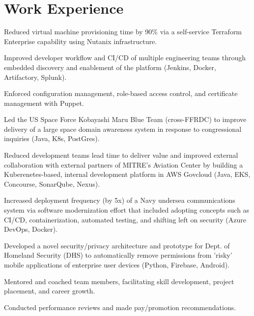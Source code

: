 \documentclass[]{deedy-resume-openfont}
\begin{document}
\section{Work Experience}
\hfill {}
\begin{tightemize}
	\item Reduced virtual machine provisioning time by 90\% via a self-service Terraform Enterprise capability using Nutanix infrastructure.
	\item Improved developer workflow and CI/CD of multiple engineering teams through embedded discovery and enablement of the platform (Jenkins, Docker, Artifactory, Splunk).
	\item Enforced configuration management, role-based access control, and certificate management with Puppet.
\end{tightemize}
\sectionsep
{}\hfill {}
\begin{tightemize}
	\item Led the US Space Force Kobayashi Maru Blue Team (cross-FFRDC) to improve delivery of a large space domain awareness system in response to congressional inquiries (Java, K8s, PostGres).
	\item Reduced development teams lead time to deliver value and improved external collaboration with external partners of MITRE's Aviation Center by building a Kuberenetes-based, internal development platform in AWS Govcloud (Java, EKS, Concourse, SonarQube, Nexus).
    \item Increased deployment frequency (by 5x) of a Navy undersea communications system via software modernization effort that included adopting concepts such as CI/CD, containerization, automated testing, and shifting left on security (Azure DevOps, Docker).
	\item Developed a novel security/privacy architecture and prototype for Dept. of Homeland Security (DHS) to automatically remove permissions from 'risky' mobile applications of enterprise user devices (Python, Firebase, Android).
\end{tightemize}
\sectionsep
{}\hfill {}
\begin{tightemize}
	\item Mentored and coached team members, facilitating skill development, project placement, and career growth.
	\item Conducted performance reviews and made pay/promotion recommendations.
\end{tightemize}
\end{document}
